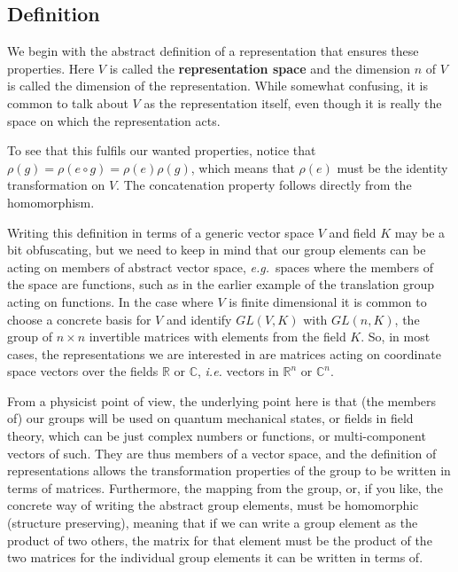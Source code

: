 \documentclass[notes.tex]{subfiles}
\begin{document}
\subsection{Definition}
We begin with the abstract definition of a representation that ensures these properties. 
Here $V$ is called the {\bf representation space} and the dimension $n$ of $V$ is called the dimension of the representation. While somewhat confusing, it is common to talk about $V$ as the representation itself, even though it is really the space on which the representation acts. 

To see that this fulfils our wanted properties, notice that $\rho(g)=\rho(e\circ g)=\rho(e)\rho(g)$, which means that $\rho(e)$ must be the identity transformation on $V$. The concatenation property follows directly from the homomorphism.

Writing this definition in terms of a generic vector space $V$ and field $K$ may be a bit obfuscating, but we need to keep in mind that our group elements can be acting on members of abstract vector space, {\it e.g.}\ spaces where the members of the space are functions, such as in the earlier example of the translation group acting on functions. In the case where $V$ is finite dimensional it is common to choose a concrete basis for $V$ and identify $GL(V,K)$ with $GL(n, K)$, the group of $n\times n$ invertible matrices with elements from the field $K$. So, in most cases, the representations we are interested in are matrices acting on coordinate space vectors over the fields $\mathbb R$ or $\mathbb C$, {\it i.e.} vectors in $\mathbb R^n$ or $\mathbb C^n$.

From a physicist point of view, the underlying point here is that (the members of) our groups will be used on quantum mechanical states, or fields in field theory, which can be just complex numbers or functions, or multi-component vectors of such. They are thus members of a vector space, and the definition of representations allows the transformation properties of the group to be written in terms of matrices. Furthermore, the mapping from the group, or, if you like, the concrete way of writing the abstract group elements, must be homomorphic (structure preserving), meaning that if we can write a group element as the product of two others, the matrix for that element must be the product of the two matrices for the individual group elements it can be written in terms of.
\end{document}
